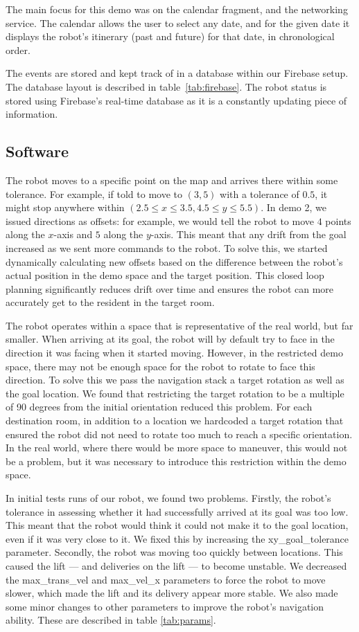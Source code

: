\documentclass{article}
\begin{document}
The main focus for this demo was on the calendar fragment, and the networking service. The calendar allows the user to select any date, and for the given date it displays the robot's itinerary (past and future) for that date, in chronological order.

 The events are stored and kept track of in a database within our Firebase setup. The database layout is described in table~\ref{tab:firebase}. The robot status is stored using Firebase's real-time database as it is a constantly updating piece of information. 

\subsection{Software}
The robot moves to a specific point on the map and arrives there within some tolerance. For example, if told to move to $(3, 5)$ with a tolerance of $0.5$, it might stop anywhere within $(2.5 \leq x \leq 3.5, 4.5 \leq y \leq 5.5)$. In demo 2, we issued directions as offsets: for example, we would tell the robot to move $4$ points along the $x$-axis and $5$ along the $y$-axis. This meant that any drift from the goal increased as we sent more commands to the robot. To solve this, we started dynamically calculating new offsets based on the difference between the robot's actual position in the demo space and the target position. This closed loop planning significantly reduces drift over time and ensures the robot can more accurately get to the resident in the target room. 

The robot operates within a space that is representative of the real world, but far smaller. When arriving at its goal, the robot will by default try to face in the direction it was facing when it started moving. However, in the restricted demo space, there may not be enough space for the robot to rotate to face this direction. To solve this we pass the navigation stack a target rotation as well as the goal location. We found that restricting the target rotation to be a multiple of 90 degrees from the initial orientation reduced this problem. For each destination room, in addition to a location we hardcoded a target rotation that ensured the robot did not need to rotate too much to reach a specific orientation. In the real world, where there would be more space to maneuver, this would not be a problem, but it was necessary to introduce this restriction within the demo space.

In initial tests runs of our robot, we found two problems.
Firstly, the robot's tolerance in assessing whether it had successfully arrived at its goal was too low. This meant that the robot would think it could not make it to the goal location, even if it was very close to it. We fixed this by increasing the xy\_goal\_tolerance parameter.
Secondly, the robot was moving too quickly between locations. This caused the lift --- and deliveries on the lift --- to become unstable. We decreased the max\_trans\_vel and max\_vel\_x parameters to force the robot to move slower, which made the lift and its delivery appear more stable.
We also made some minor changes to other parameters to improve the robot's navigation ability. These are described in table \ref{tab:params}.  
\end{document}
